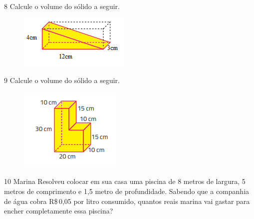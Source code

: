 {{{{



\num{8} Calcule o volume do sólido a seguir.

\begin{figure}[H]
\centering\includegraphics[width=2.08333in,height=1in]{./imgSAEB_8_MAT/media/image52.png}
\end{figure}




\num{9} Calcule o volume do sólido a seguir.

\begin{figure}[H]
\centering\includegraphics[width=1.92708in,height=1.5625in]{./imgSAEB_8_MAT/media/image53.png}
\end{figure}







\num{10} Marina Resolveu colocar em sua casa uma piscina de 8 metros de
largura, 5 metros de comprimento e 1,5 metro de profundidade. Sabendo
que a companhia de água cobra R\$\,0,05 por litro consumido, quantos
reais marina vai gastar para encher completamente essa piscina?


}}}}
